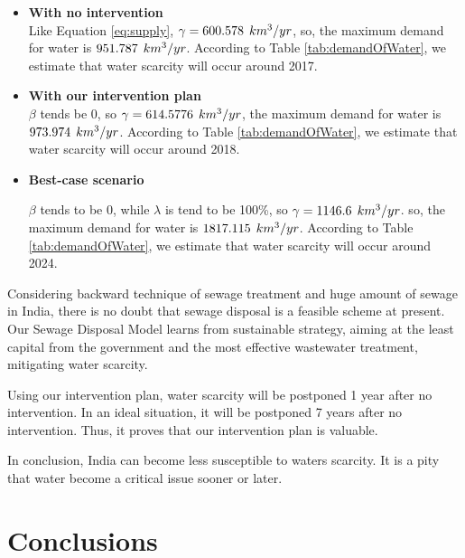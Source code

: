 \documentclass[tcn = 45538, sheet = true, abstract = true]{mcmthesis}
\begin{document}
\begin{itemize}

\item \textbf{With no intervention} \\

Like Equation \ref{eq:supply}, 
$\gamma = 600.578\hspace{1 ex}km^3/yr$, 
so, the maximum demand for water is $951.787\hspace{1 ex}km^3/yr$. 
According to Table \ref{tab:demandOfWater}, 
we estimate that water scarcity will occur around 2017. 

\item \textbf{With our intervention plan} \\

$\beta$ tends be 0, 
so $\gamma = 614.5776\hspace{1 ex}km^3/yr$, 
the maximum demand for water is $973.974\hspace{1 ex}km^3/yr$. 
According to Table \ref{tab:demandOfWater}, 
we estimate that water scarcity will occur around 2018. 

\item \textbf{Best-case scenario}

$\beta$ tends to be 0, 
while $\lambda$ is tend to be 100\%, 
so $\gamma = 1146.6\hspace{1 ex}km^3/yr$. 
so, the maximum demand for water is $1817.115\hspace{1 ex}km^3/yr$. 
According to Table \ref{tab:demandOfWater}, 
we estimate that water scarcity will occur around 2024. 

\end{itemize}

Considering backward technique of sewage treatment and huge amount of sewage in India, 
there is no doubt that sewage disposal is a feasible scheme at present. 
Our Sewage Disposal Model learns from sustainable strategy, 
aiming at the least capital from the government and the most effective wastewater treatment, 
mitigating water scarcity.

Using our intervention plan, 
water scarcity will be postponed 1 year after no intervention. 
In an ideal situation, 
it will be postponed 7 years after no intervention. 
Thus, 
it proves that our intervention plan is valuable.

In conclusion, 
India can become less susceptible to waters scarcity. 
It is a pity that water become a critical issue sooner or later.

\section{Conclusions}
\end{document}
